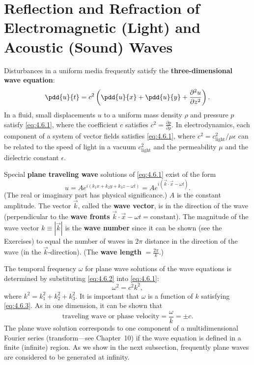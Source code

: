 \section{Reflection and Refraction of Electromagnetic (Light) and Acoustic (Sound) Waves}
\label{sec:reflection-refraction}

Disturbances in a uniform media frequently satisfy the \textbf{three-dimensional wave equation}:
\begin{equation}
\pdd{u}{t} = c^2\left(\pdd{u}{x} + \pdd{u}{y} + \frac{\partial^2 u}{\partial z^2}\right).
\label{eq:4.6.1}
\end{equation}
In a fluid, small displacements $u$ to a uniform mass density $\rho$ and pressure $p$ satisfy \eqref{eq:4.6.1}, where the coefficient $c$ satisfies $c^2 = \frac{\partial p}{\partial\rho}$.  In electrodynamics, each component of a system of vector fields satisfies \eqref{eq:4.6.1}, where $c^2 = c_{\text{light}}^2/\mu\epsilon$ can be related to the speed of light in a vacuum $c_{\text{light}}^2$ and the permeability $\mu$ and the dielectric constant $\epsilon$.

Special \textbf{plane traveling wave} solutions of \eqref{eq:4.6.1} exist of the form
\begin{equation}
u = Ae^{i(k_1 x + k_2 y + k_3 z - \omega t)} = Ae^{i(\vec{k}\cdot\vec{x} - \omega t)}.
\label{eq:4.6.2}
\end{equation}
(The real or imaginary part has physical significance.)  $A$ is the constant amplitude.  The vector $\vec{k}$, called the \textbf{wave vector}, is in the direction of the wave (perpendicular to the \textbf{wave fronts} $\vec{k}\cdot\vec{x} - \omega t = \text{constant}$).  The magnitude of the wave vector $k \equiv |\vec{k}|$ is the \textbf{wave number} since it can be shown (see the Exercises) to equal the number of waves in $2\pi$ distance in the direction of the wave (in the $\vec{k}$-direction).  (The \textbf{wave length} $= \frac{2\pi}{k}$.)

The temporal frequency $\omega$ for plane wave solutions of the wave equations is determined by substituting \eqref{eq:4.6.2} into \eqref{eq:4.6.1}:
\begin{equation}
\omega^2 = c^2 k^2,
\label{eq:4.6.3}
\end{equation}
where $k^2 = k_1^2 + k_2^2 + k_3^2$.  It is important that $\omega$ is a function of $k$ satisfying \eqref{eq:4.6.3}.  As in one dimension, it can be shown that
\begin{equation}
\text{traveling wave or phase velocity} = \frac{\omega}{k} = \pm c.
\label{eq:4.6.4}
\end{equation}
The plane wave solution corresponds to one component of a multidimensional Fourier series (transform---see Chapter~10) if the wave equation is defined in a finite (infinite) region.  As we show in the next subsection, frequently plane waves are considered to be generated at infinity.

